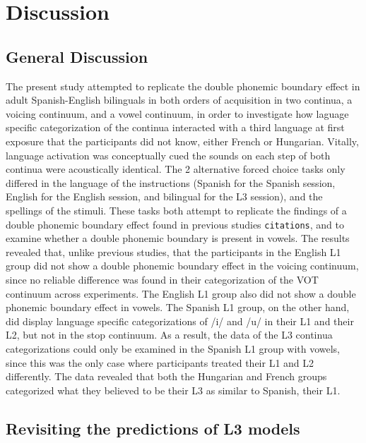 \documentclass[
  english,
  man]{apa6}
\begin{document}
\hypertarget{discussion}{%
\section{Discussion}\label{discussion}}

\hypertarget{general-discussion}{%
\subsection{General Discussion}\label{general-discussion}}

The present study attempted to replicate the double phonemic boundary effect in adult Spanish-English bilinguals in both orders of acquisition in two continua, a voicing continuum, and a vowel continuum, in order to investigate how laguage specific categorization of the continua interacted with a third language at first exposure that the participants did not know, either French or Hungarian. Vitally, language activation was conceptually cued the sounds on each step of both continua were acoustically identical. The 2 alternative forced choice tasks only differed in the language of the instructions (Spanish for the Spanish session, English for the English session, and bilingual for the L3 session), and the spellings of the stimuli. These tasks both attempt to replicate the findings of a double phonemic boundary effect found in previous studies \texttt{citations}, and to examine whether a double phonemic boundary is present in vowels. The results revealed that, unlike previous studies, that the participants in the English L1 group did not show a double phonemic boundary effect in the voicing continuum, since no reliable difference was found in their categorization of the VOT continuum across experiments. The English L1 group also did not show a double phonemic boundary effect in vowels. The Spanish L1 group, on the other hand, did display language specific categorizations of /i/ and /u/ in their L1 and their L2, but not in the stop continuum. As a result, the data of the L3 continua categorizations could only be examined in the Spanish L1 group with vowels, since this was the only case where participants treated their L1 and L2 differently. The data revealed that both the Hungarian and French groups categorized what they believed to be their L3 as similar to Spanish, their L1.

\hypertarget{revisiting-the-predictions-of-l3-models}{%
\subsection{Revisiting the predictions of L3 models}\label{revisiting-the-predictions-of-l3-models}}
\end{document}
